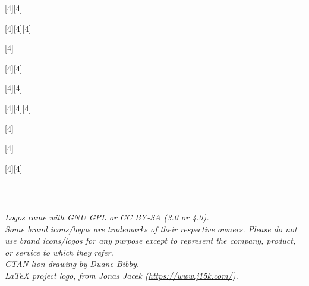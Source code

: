 \documentclass[11pt,a4paper]{ltxdoc}
\begin{document}
\begin{tcolorbox}[colframe=lightgray,colback=lightgray!5]
\begin{center}
\scalebox{4}[4]{\logogeogebra}\hspace{1cm}\scalebox{4}[4]{\logogeogebra[icon]}

\medskip

\scalebox{4}[4]{\logoscratch}\hspace{1cm}\scalebox{4}[4]{\logoscratch[alt]}\hspace{1cm}\scalebox{4}[4]{\logoscratch[cat]}

\medskip

\scalebox{4}[4]{\logotexstudio}

\medskip

\scalebox{4}[4]{\logoemacs}\hspace{1cm}\scalebox{4}[4]{\logoemacs[alt]}

\medskip

\scalebox{4}[4]{\logotexmaker}\hspace{1cm}\scalebox{4}[4]{\logotexmaker[alt]}

\medskip

\scalebox{4}[4]{\logomiktex}\hspace{1cm}\scalebox{4}[4]{\logomiktex[icon]}\hspace{1cm}\scalebox{4}[4]{}

\medskip

\scalebox{4}[4]{\logoctanlion}

\medskip

\scalebox{4}[4]{\logolatexproject}

\medskip

\scalebox{4}[4]{\logotexworks}\hspace{1cm}\scalebox{4}[4]{\logotexworks[alt]}
\end{center}
\end{tcolorbox}

\vfill~

\hrule

\medskip

\emph{%
Logos came with GNU GPL or CC BY-SA (3.0 or 4.0).\\
Some brand icons/logos are trademarks of their respective owners. Please do not use brand icons/logos for any purpose except to represent the company, product, or service to which they refer.\\
CTAN lion drawing by Duane Bibby.\\
LaTeX project logo, from Jonas Jacek (\url{https://www.j15k.com/}).
}
\end{document}
